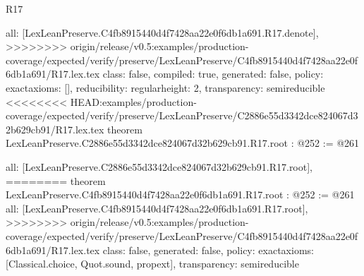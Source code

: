 \begin{lexlean}{R17}
\begin{coremodule}
{{{{{  all: [LexLeanPreserve.C4fb8915440d4f7428aa22e0f6db1a691.R17.denote],
>>>>>>>> origin/release/v0.5:examples/production-coverage/expected/verify/preserve/LexLeanPreserve/C4fb8915440d4f7428aa22e0f6db1a691/R17.lex.tex
  class: false,
  compiled: true,
  generated: false,
  policy: exact{axioms: []},
  reducibility: regular{height: 2},
  transparency: semireducible
}
<<<<<<<< HEAD:examples/production-coverage/expected/verify/preserve/LexLeanPreserve/C2886e55d3342dce824067d32b629cb91/R17.lex.tex
theorem LexLeanPreserve.C2886e55d3342dce824067d32b629cb91.R17.root : @252 := @261 {
  all: [LexLeanPreserve.C2886e55d3342dce824067d32b629cb91.R17.root],
========
theorem LexLeanPreserve.C4fb8915440d4f7428aa22e0f6db1a691.R17.root : @252 := @261 {
  all: [LexLeanPreserve.C4fb8915440d4f7428aa22e0f6db1a691.R17.root],
>>>>>>>> origin/release/v0.5:examples/production-coverage/expected/verify/preserve/LexLeanPreserve/C4fb8915440d4f7428aa22e0f6db1a691/R17.lex.tex
  class: false,
  generated: false,
  policy: exact{axioms: [Classical.choice, Quot.sound, propext]},
  transparency: semireducible
}

}}}}}
\end{coremodule}
\end{lexlean}
